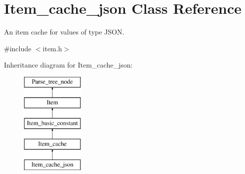 \hypertarget{classItem__cache__json}{}\section{Item\+\_\+cache\+\_\+json Class Reference}
\label{classItem__cache__json}


An item cache for values of type J\+S\+ON.  




{\ttfamily \#include $<$item.\+h$>$}

Inheritance diagram for Item\+\_\+cache\+\_\+json\+:\begin{figure}[H]
\begin{center}
\leavevmode
\includegraphics[height=5.000000cm]{classItem__cache__json}
\end{center}
\end{figure}

